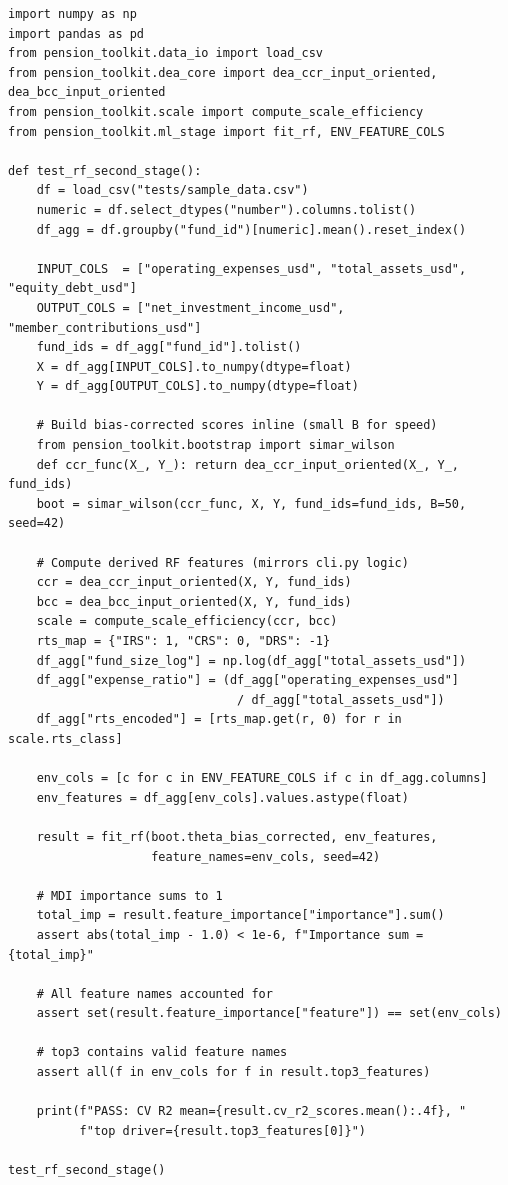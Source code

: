 \documentclass[12pt,a4paper]{article}
\begin{document}
\begin{lstlisting}[style=python, caption={Test: derived features correct; RF importance sums to 1}]
import numpy as np
import pandas as pd
from pension_toolkit.data_io import load_csv
from pension_toolkit.dea_core import dea_ccr_input_oriented, dea_bcc_input_oriented
from pension_toolkit.scale import compute_scale_efficiency
from pension_toolkit.ml_stage import fit_rf, ENV_FEATURE_COLS

def test_rf_second_stage():
    df = load_csv("tests/sample_data.csv")
    numeric = df.select_dtypes("number").columns.tolist()
    df_agg = df.groupby("fund_id")[numeric].mean().reset_index()

    INPUT_COLS  = ["operating_expenses_usd", "total_assets_usd", "equity_debt_usd"]
    OUTPUT_COLS = ["net_investment_income_usd", "member_contributions_usd"]
    fund_ids = df_agg["fund_id"].tolist()
    X = df_agg[INPUT_COLS].to_numpy(dtype=float)
    Y = df_agg[OUTPUT_COLS].to_numpy(dtype=float)

    # Build bias-corrected scores inline (small B for speed)
    from pension_toolkit.bootstrap import simar_wilson
    def ccr_func(X_, Y_): return dea_ccr_input_oriented(X_, Y_, fund_ids)
    boot = simar_wilson(ccr_func, X, Y, fund_ids=fund_ids, B=50, seed=42)

    # Compute derived RF features (mirrors cli.py logic)
    ccr = dea_ccr_input_oriented(X, Y, fund_ids)
    bcc = dea_bcc_input_oriented(X, Y, fund_ids)
    scale = compute_scale_efficiency(ccr, bcc)
    rts_map = {"IRS": 1, "CRS": 0, "DRS": -1}
    df_agg["fund_size_log"] = np.log(df_agg["total_assets_usd"])
    df_agg["expense_ratio"] = (df_agg["operating_expenses_usd"]
                                / df_agg["total_assets_usd"])
    df_agg["rts_encoded"] = [rts_map.get(r, 0) for r in scale.rts_class]

    env_cols = [c for c in ENV_FEATURE_COLS if c in df_agg.columns]
    env_features = df_agg[env_cols].values.astype(float)

    result = fit_rf(boot.theta_bias_corrected, env_features,
                    feature_names=env_cols, seed=42)

    # MDI importance sums to 1
    total_imp = result.feature_importance["importance"].sum()
    assert abs(total_imp - 1.0) < 1e-6, f"Importance sum = {total_imp}"

    # All feature names accounted for
    assert set(result.feature_importance["feature"]) == set(env_cols)

    # top3 contains valid feature names
    assert all(f in env_cols for f in result.top3_features)

    print(f"PASS: CV R2 mean={result.cv_r2_scores.mean():.4f}, "
          f"top driver={result.top3_features[0]}")

test_rf_second_stage()
\end{lstlisting}
\end{document}
